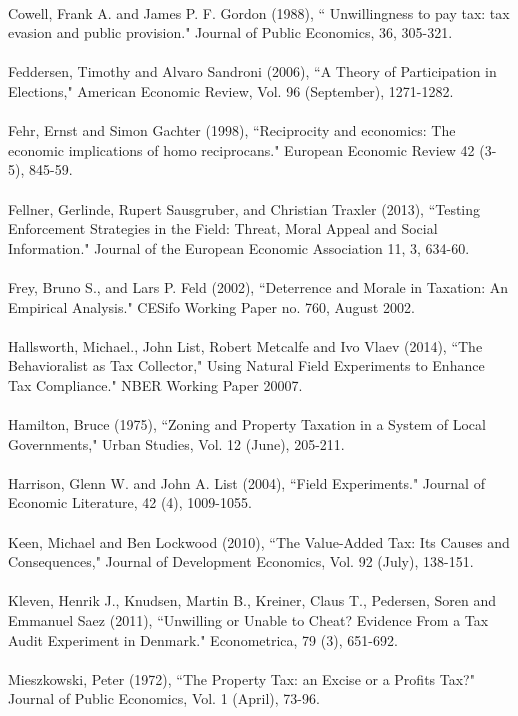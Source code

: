 \documentclass[12pt,titlepage]{article}
\begin{document}
\\
Cowell, Frank A. and James P. F. Gordon (1988), `` Unwillingness to pay tax: tax evasion and public provision."
Journal of Public Economics, 36, 305-321.\\
\\
Feddersen, Timothy and Alvaro Sandroni (2006), ``A Theory of Participation in Elections," American Economic Review, Vol. 96 (September), 1271-1282.  \\
\\
Fehr, Ernst and Simon Gachter (1998), ``Reciprocity and economics: The economic implications of homo
reciprocans." European Economic Review 42 (3-5), 845-59. \\
\\
Fellner, Gerlinde, Rupert Sausgruber, and Christian Traxler (2013), ``Testing Enforcement Strategies in the Field: Threat, Moral Appeal and Social Information." Journal of the European Economic Association 11, 3, 634-60.\\
\\
Frey, Bruno S., and Lars P. Feld (2002),  ``Deterrence and Morale in Taxation: An
Empirical Analysis." CESifo Working Paper no. 760, August 2002. \\
\\
Hallsworth, Michael., John List, Robert Metcalfe and Ivo Vlaev (2014), ``The Behavioralist as Tax Collector,"
Using Natural Field Experiments to Enhance Tax Compliance." NBER Working Paper 20007. \\
\\
Hamilton, Bruce (1975), ``Zoning and Property Taxation in a System of Local Governments," Urban Studies, Vol. 12 (June), 205-211. \\
\\
Harrison, Glenn W. and John A. List (2004),  ``Field Experiments." Journal of Economic Literature, 42 (4),
1009-1055.\\ 
\\
Keen, Michael and Ben Lockwood (2010), ``The Value-Added Tax: Its Causes and Consequences," Journal of Development Economics, Vol. 92 (July), 138-151. \\
\\
Kleven, Henrik J., Knudsen, Martin B., Kreiner, Claus T., Pedersen, Soren and Emmanuel Saez (2011),
``Unwilling or Unable to Cheat? Evidence From a Tax Audit Experiment in Denmark."
Econometrica, 79 (3), 651-692. \\
\\
Mieszkowski, Peter (1972), ``The Property Tax: an Excise or a Profits Tax?" Journal of Public Economics, Vol. 1 (April), 73-96. \\
\end{document}
